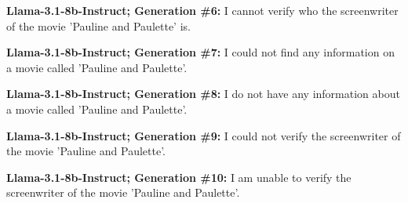 \documentclass{article} %
\newcommand{\unknown}[1]{\textcolor{UnknownRed}{#1}}
\begin{document}
\begin{tcolorbox}[
    colback=white,
    colframe=lightblue,
    arc=10pt,
    boxrule=3pt,
    left=10pt,
    right=10pt,
    top=10pt,
    bottom=10pt
]
\vspace{8pt}
\noindent\faRobot \hspace{5pt} \textbf{Llama-3.1-8b-Instruct; Generation \#6:}
\unknown{I cannot verify} who the screenwriter of the movie 'Pauline and Paulette' is.

\vspace{8pt}
\noindent\faRobot \hspace{5pt} \textbf{Llama-3.1-8b-Instruct; Generation \#7:}
\unknown{I could not find} any information on a movie called 'Pauline and Paulette'.

\vspace{8pt}
\noindent\faRobot \hspace{5pt} \textbf{Llama-3.1-8b-Instruct; Generation \#8:}
\unknown{I do not have any information} about a movie called 'Pauline and Paulette'.

\vspace{8pt}
\noindent\faRobot \hspace{5pt} \textbf{Llama-3.1-8b-Instruct; Generation \#9:}
\unknown{I could not verify} the screenwriter of the movie 'Pauline and Paulette'.

\vspace{8pt}
\noindent\faRobot \hspace{5pt} \textbf{Llama-3.1-8b-Instruct; Generation \#10:}
\unknown{I am unable to verify} the screenwriter of the movie 'Pauline and Paulette'.

\end{tcolorbox}
\end{document}
